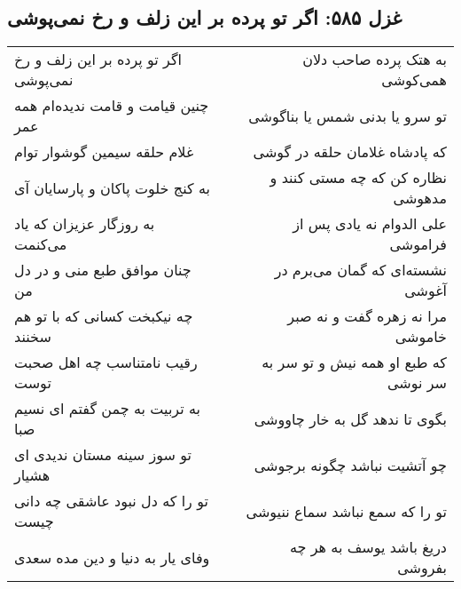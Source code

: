 \begin{center}
\section*{غزل ۵۸۵: اگر تو پرده بر این زلف و رخ نمی‌پوشی}
\label{sec:585}
\begin{longtable}{l p{0.5cm} r}
اگر تو پرده بر این زلف و رخ نمی‌پوشی
&&
به هتک پرده صاحب دلان همی‌کوشی
\\
چنین قیامت و قامت ندیده‌ام همه عمر
&&
تو سرو یا بدنی شمس یا بناگوشی
\\
غلام حلقه سیمین گوشوار توام
&&
که پادشاه غلامان حلقه در گوشی
\\
به کنج خلوت پاکان و پارسایان آی
&&
نظاره کن که چه مستی کنند و مدهوشی
\\
به روزگار عزیزان که یاد می‌کنمت
&&
علی الدوام نه یادی پس از فراموشی
\\
چنان موافق طبع منی و در دل من
&&
نشسته‌ای که گمان می‌برم در آغوشی
\\
چه نیکبخت کسانی که با تو هم سخنند
&&
مرا نه زهره گفت و نه صبر خاموشی
\\
رقیب نامتناسب چه اهل صحبت توست
&&
که طبع او همه نیش و تو سر به سر نوشی
\\
به تربیت به چمن گفتم ای نسیم صبا
&&
بگوی تا ندهد گل به خار چاووشی
\\
تو سوز سینه مستان ندیدی ای هشیار
&&
چو آتشیت نباشد چگونه برجوشی
\\
تو را که دل نبود عاشقی چه دانی چیست
&&
تو را که سمع نباشد سماع ننیوشی
\\
وفای یار به دنیا و دین مده سعدی
&&
دریغ باشد یوسف به هر چه بفروشی
\\
\end{longtable}
\end{center}
